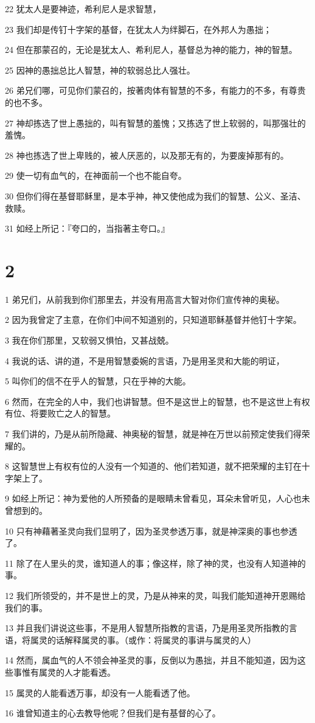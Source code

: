 \par 22 犹太人是要神迹，希利尼人是求智慧，
\par 23 我们却是传钉十字架的基督，在犹太人为绊脚石，在外邦人为愚拙；
\par 24 但在那蒙召的，无论是犹太人、希利尼人，基督总为神的能力，神的智慧。
\par 25 因神的愚拙总比人智慧，神的软弱总比人强壮。
\par 26 弟兄们哪，可见你们蒙召的，按著肉体有智慧的不多，有能力的不多，有尊贵的也不多。
\par 27 神却拣选了世上愚拙的，叫有智慧的羞愧；又拣选了世上软弱的，叫那强壮的羞愧。
\par 28 神也拣选了世上卑贱的，被人厌恶的，以及那无有的，为要废掉那有的。
\par 29 使一切有血气的，在神面前一个也不能自夸。
\par 30 但你们得在基督耶稣里，是本乎神，神又使他成为我们的智慧、公义、圣洁、救赎。
\par 31 如经上所记：『夸口的，当指著主夸口。』

\chapter{2}

\par 1 弟兄们，从前我到你们那里去，并没有用高言大智对你们宣传神的奥秘。
\par 2 因为我曾定了主意，在你们中间不知道别的，只知道耶稣基督并他钉十字架。
\par 3 我在你们那里，又软弱又惧怕，又甚战兢。
\par 4 我说的话、讲的道，不是用智慧委婉的言语，乃是用圣灵和大能的明证，
\par 5 叫你们的信不在乎人的智慧，只在乎神的大能。
\par 6 然而，在完全的人中，我们也讲智慧。但不是这世上的智慧，也不是这世上有权有位、将要败亡之人的智慧。
\par 7 我们讲的，乃是从前所隐藏、神奥秘的智慧，就是神在万世以前预定使我们得荣耀的。
\par 8 这智慧世上有权有位的人没有一个知道的、他们若知道，就不把荣耀的主钉在十字架上了。
\par 9 如经上所记：神为爱他的人所预备的是眼睛未曾看见，耳朵未曾听见，人心也未曾想到的。
\par 10 只有神藉著圣灵向我们显明了，因为圣灵参透万事，就是神深奥的事也参透了。
\par 11 除了在人里头的灵，谁知道人的事；像这样，除了神的灵，也没有人知道神的事。
\par 12 我们所领受的，并不是世上的灵，乃是从神来的灵，叫我们能知道神开恩赐给我们的事。
\par 13 并且我们讲说这些事，不是用人智慧所指教的言语，乃是用圣灵所指教的言语，将属灵的话解释属灵的事。（或作：将属灵的事讲与属灵的人）
\par 14 然而，属血气的人不领会神圣灵的事，反倒以为愚拙，并且不能知道，因为这些事惟有属灵的人才能看透。
\par 15 属灵的人能看透万事，却没有一人能看透了他。
\par 16 谁曾知道主的心去教导他呢？但我们是有基督的心了。

